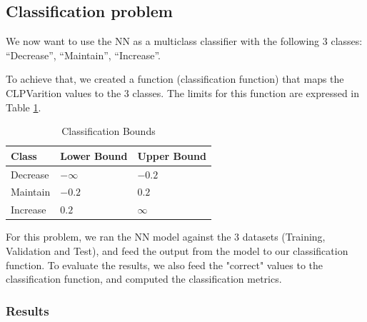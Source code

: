 \newpage

\subsection{Classification problem}

We now want to use the NN as a multiclass classifier with the following 3 classes: “Decrease”, “Maintain”, “Increase”.

To achieve that, we created a function (classification function) that maps the CLPVarition values to the 3 classes. The limits for this function are expressed in Table \ref{tab:classifications}.

\begin{table}[H]
    \centering
    \begin{tabular}{|l|l|l|}
        \hline
        Class    & Lower Bound & Upper Bound  \\
        \hline
        Decrease & $-\infty$   & $-0.2$       \\
        \hline
        Maintain & $-0.2$      & $0.2$        \\
        \hline
        Increase & $0.2$       & $\infty$     \\
        \hline
    \end{tabular}
    \caption{Classification Bounds}
    \label{tab:classifications}
\end{table}

For this problem, we ran the NN model against the 3 datasets (Training, Validation and Test), and feed the output from the model to our classification function. To evaluate the results, we also feed the "correct" values to the classification function, and computed the classification metrics.

\subsubsection{Results}


